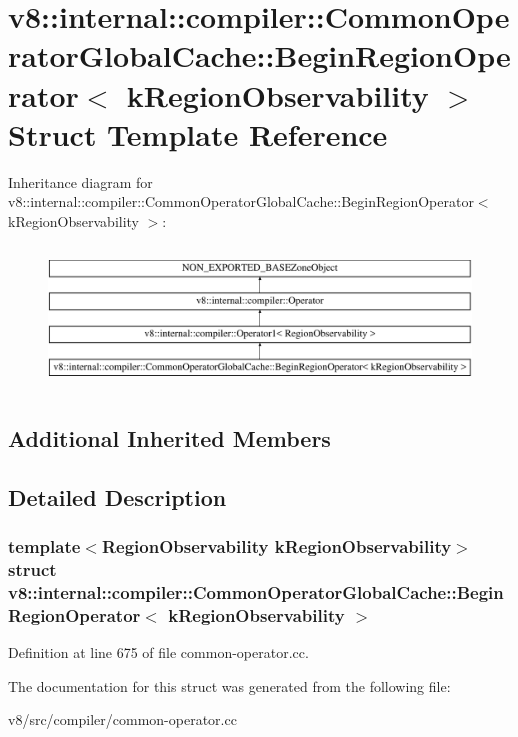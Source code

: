 \hypertarget{structv8_1_1internal_1_1compiler_1_1CommonOperatorGlobalCache_1_1BeginRegionOperator}{}\section{v8\+:\+:internal\+:\+:compiler\+:\+:Common\+Operator\+Global\+Cache\+:\+:Begin\+Region\+Operator$<$ k\+Region\+Observability $>$ Struct Template Reference}
\label{structv8_1_1internal_1_1compiler_1_1CommonOperatorGlobalCache_1_1BeginRegionOperator}
Inheritance diagram for v8\+:\+:internal\+:\+:compiler\+:\+:Common\+Operator\+Global\+Cache\+:\+:Begin\+Region\+Operator$<$ k\+Region\+Observability $>$\+:\begin{figure}[H]
\begin{center}
\leavevmode
\includegraphics[height=3.822526cm]{structv8_1_1internal_1_1compiler_1_1CommonOperatorGlobalCache_1_1BeginRegionOperator}
\end{center}
\end{figure}
\subsection*{Additional Inherited Members}


\subsection{Detailed Description}
\subsubsection*{template$<$Region\+Observability k\+Region\+Observability$>$\newline
struct v8\+::internal\+::compiler\+::\+Common\+Operator\+Global\+Cache\+::\+Begin\+Region\+Operator$<$ k\+Region\+Observability $>$}



Definition at line 675 of file common-\/operator.\+cc.



The documentation for this struct was generated from the following file\+:\begin{DoxyCompactItemize}
\item 
v8/src/compiler/common-\/operator.\+cc\end{DoxyCompactItemize}
